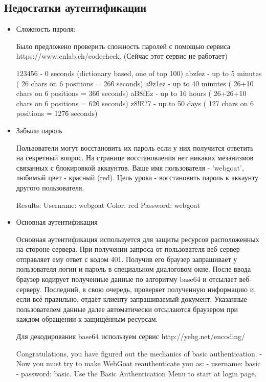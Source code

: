 \documentclass{article}
\begin{document}
\subsection{Недостатки аутентификации}

\begin{itemize}
	
	\item Сложность пароля:
	
	Было предложено проверить сложность паролей с помощью сервиса  https://www.cnlab.ch/codecheck. (Сейчас этот сервис не работает)
	
	123456 - 0 seconds (dictionary based, one of top 100)
	abzfez - up to 5 minutes ( 26 chars on 6 positions = 26\^6 seconds)
	a9z1ez - up to 40 minutes ( 26+10 chars on 6 positions = 36\^6 seconds)
	aB8fEz - up to 16 hours ( 26+26+10 chars on 6 positions = 62\^6 seconds)
	z8!E?7 - up to 50 days ( 127 chars on 6 positions = 127\^6 seconds)
	
	\item Забыли пароль
	
	Пользователи могут восстановить их пароль если у них получится ответить на секретный вопрос. На странице
	восстановления нет никаких мезанизмов связанных с блокировкой аккаунтов. Ваше имя пользователя - 'webgoat',
	любимый цвет - красный (red). Цель урока - восстановить пароль к аккаунту другого пользователя.
	
	Results:
	Username: webgoat
	Color: red
	Password: webgoat
	
	\item Основная аутентификация
	
	Основная аутентификация используется для защиты ресурсов расположенных на стороне сервера.
	При получении запроса от пользователя веб-сервер отправляет ему ответ с кодом 401.
	Получив его браузер запрашивает у пользователя логин и пароль в специальном диалоговом окне. После
	ввода браузер кодирует полученные данные по алгоритму base64 и отсылает веб-серверу.
	Последний, в свою очередь, проверяет полученную информацию и, если всё правильно, отдаёт клиенту запрашиваемый
	документ. Указанные пользователем данные далее автоматически отсылаются браузером при каждом обращении к
	защищённым ресурсам.
	
	Для декодирования base64 используем сервис http://yehg.net/encoding/
	
	Congratulations, you have figured out the mechanics of basic authentication.  
	- Now you must try to make WebGoat reauthenticate you as:
	- username: basic     
	- password: basic. 
	Use the Basic Authentication Menu to start at login page.
	

\end{itemize}
\end{document}
